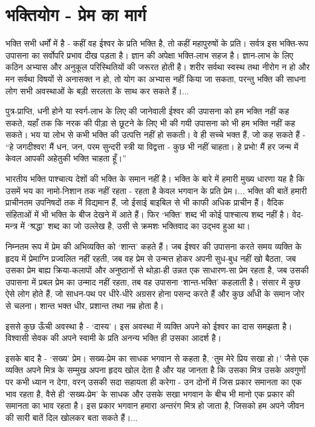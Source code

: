 \section*{भक्तियोग - प्रेम का मार्ग}


भक्ति सभी धर्मों में है - कहीं वह ईश्वर के प्रति भक्ति है, तो कहीं महापुरुषों के प्रति। सर्वत्र इस भक्ति-रूप उपासना का सर्वोपरि प्रभाव दीख पड़ता है। ज्ञान की अपेक्षा भक्ति-लाभ सहज है। ज्ञान-लाभ के लिए कठिन अभ्यास और अनुकूल परिस्थितियों की जरूरत होती है। शरीर सर्वथा स्वस्थ तथा नीरोग न हो और मन सर्वथा विषयों से अनासक्त न हो, तो योग का अभ्यास नहीं किया जा सकता, परन्तु भक्ति की साधना लोग सभी अवस्थाओं के बड़ी सरलता के साथ कर सकते हैं।... 

पुत्र-प्राप्ति, धनी होने या स्वर्ग-लाभ के लिए की जानेवाली ईश्वर की उपासना को हम भक्ति नहीं कह सकते, यहाँ तक कि नरक की पीड़ा से छूटने के लिए भी की गयी उपासना को भी हम भक्ति नहीं कह सकते। भय या लोभ से कभी भक्ति की उत्पत्ति नहीं हो सकती। वे ही सच्चे भक्त हैं, जो कह सकते हैं - “हे जगदीश्वर! मैं धन, जन, परम सुन्दरी स्त्री या विद्वत्ता - कुछ भी नहीं चाहता। हे प्रभो! मैं हर जन्म में केवल आपकी अहेतुकी भक्ति चाहता हूँ।” 

भारतीय भक्ति पाश्चात्य देशों की भक्ति के समान नहीं है। भक्ति के बारे में हमारी मुख्य धारणा यह है कि उसमें भय का नामो-निशान तक नहीं रहता - रहता है केवल भगवान के प्रति प्रेम।... भक्ति की बातें हमारी प्राचीनतम उपनिषदों तक में विद्यमान हैं, जो ईसाई बाइबिल से भी काफी अधिक प्राचीन हैं। वैदिक संहिताओं में भी भक्ति के बीज देखने में आते हैं। फिर ‘भक्ति’ शब्द भी कोई पाश्चात्य शब्द नहीं है। वेद-मन्त्र में ‘श्रद्धा’ शब्द का जो उल्लेख है, उसी से क्रमशः भक्तिवाद का उद्भव हुआ था। 

निम्नतम रूप में प्रेम की अभिव्यक्ति को ‘शान्त’ कहते हैं। जब ईश्वर की उपासना करते समय व्यक्ति के हृदय में प्रेमाग्नि प्रज्वलित नहीं रहती, जब वह प्रेम से उन्मत्त होकर अपनी सुध-बुध नहीं खो बैठता, जब उसका प्रेम बाह्य क्रिया-कलापों और अनुष्ठानों से थोड़ा-ही उन्नत एक साधारण-सा प्रेम रहता है, जब उसकी उपासना में प्रबल प्रेम का उन्माद नहीं रहता, तब वह उपासना ‘शान्त-भक्ति’ कहलाती है। संसार में कुछ ऐसे लोग होते हैं, जो साधन-पथ पर धीरे-धीरे अग्रसर होना पसन्द करते हैं और कुछ आँधी के समान जोर से चलना। शान्त भक्त धीर, प्रशान्त तथा नम्र होता है। 

इससे कुछ ऊँची अवस्था है - ‘दास्य’। इस अवस्था में व्यक्ति अपने को ईश्वर का दास समझता है। विश्वासी सेवक की अपने स्वामी के प्रति अनन्य भक्ति ही उसका आदर्श है। 

इसके बाद है - ‘सख्य’ प्रेम। सख्य-प्रेम का साधक भगवान से कहता है, ‘तुम मेरे प्रिय सखा हो।’ जैसे एक व्यक्ति अपने मित्र के सम्मुख अपना हृदय खोल देता है और यह जानता है कि उसका मित्र उसके अवगुणों पर कभी ध्यान न देगा, वरन् उसकी सदा सहायता ही करेगा - उन दोनों में जिस प्रकार समानता का एक भाव रहता है, वैसे ही ‘सख्य-प्रेम’ के साधक और उसके सखा भगवान के बीच भी मानो एक प्रकार की समानता का भाव रहता है। इस प्रकार भगवान हमारा अन्तरंग मित्र हो जाता है, जिसको हम अपने जीवन की सारी बातें दिल खोलकर बता सकते हैं।... 

